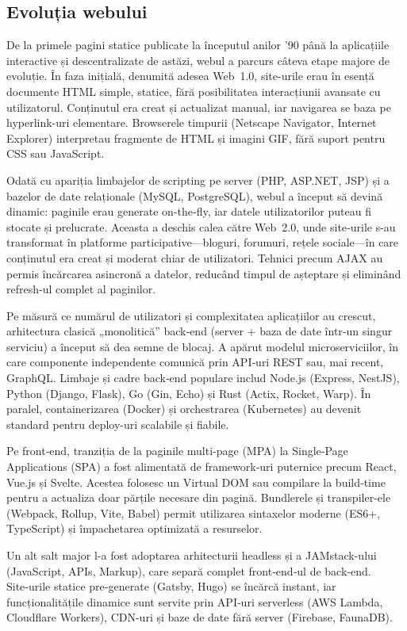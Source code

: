 \documentclass[titlepage,12pt]{article}
\begin{document}
\subsection{Evoluția webului}

De la primele pagini statice publicate la începutul anilor ’90 până la aplicațiile interactive și descentralizate de astăzi, webul a parcurs câteva etape majore de evoluție. În faza inițială, denumită adesea Web 1.0, site-urile erau în esență documente HTML simple, statice, fără posibilitatea interacțiunii avansate cu utilizatorul. Conținutul era creat și actualizat manual, iar navigarea se baza pe hyperlink-uri elementare. Browserele timpurii (Netscape Navigator, Internet Explorer) interpretau fragmente de HTML și imagini GIF, fără suport pentru CSS sau JavaScript.

Odată cu apariția limbajelor de scripting pe server (PHP, ASP.NET, JSP) și a bazelor de date relaționale (MySQL, PostgreSQL), webul a început să devină dinamic: paginile erau generate on‑the‑fly, iar datele utilizatorilor puteau fi stocate și prelucrate. Aceasta a deschis calea către Web 2.0, unde site‑urile s-au transformat în platforme participative—bloguri, forumuri, rețele sociale—în care conținutul era creat și moderat chiar de utilizatori. Tehnici precum AJAX au permis încărcarea asincronă a datelor, reducând timpul de așteptare și eliminând refresh‑ul complet al paginilor.

Pe măsură ce numărul de utilizatori și complexitatea aplicațiilor au crescut, arhitectura clasică „monolitică” back‑end (server + baza de date într‑un singur serviciu) a început să dea semne de blocaj. A apărut modelul microserviciilor, în care componente independente comunică prin API‑uri REST sau, mai recent, GraphQL. Limbaje și cadre back‑end populare includ Node.js (Express, NestJS), Python (Django, Flask), Go (Gin, Echo) și Rust (Actix, Rocket, Warp). În paralel, containerizarea (Docker) și orchestrarea (Kubernetes) au devenit standard pentru deploy-uri scalabile și fiabile.

Pe front‑end, tranziția de la paginile multi‑page (MPA) la Single‑Page Applications (SPA) a fost alimentată de framework‑uri puternice precum React, Vue.js și Svelte. Acestea folosesc un Virtual DOM sau compilare la build‑time pentru a actualiza doar părțile necesare din pagină. Bundlerele și transpiler-ele (Webpack, Rollup, Vite, Babel) permit utilizarea sintaxelor moderne (ES6+, TypeScript) și împachetarea optimizată a resurselor.

Un alt salt major l-a fost adoptarea arhitecturii headless și a JAMstack-ului (JavaScript, APIs, Markup), care separă complet front‑end‑ul de back‑end. Site‑urile statice pre‑generate (Gatsby, Hugo) se încărcă instant, iar funcționalitățile dinamice sunt servite prin API‑uri serverless (AWS Lambda, Cloudflare Workers), CDN-uri și baze de date fără server (Firebase, FaunaDB).
\end{document}
